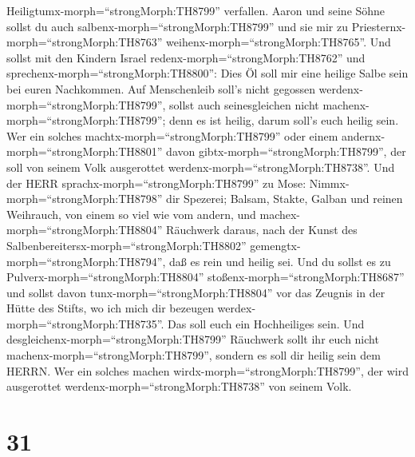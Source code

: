 Heiligtumx-morph=``strongMorph:TH8799'' verfallen.  Aaron
und seine Söhne sollst du auch salbenx-morph=``strongMorph:TH8799'' und
sie mir zu Priesternx-morph=``strongMorph:TH8763''
weihenx-morph=``strongMorph:TH8765''.  Und sollst mit den
Kindern Israel redenx-morph=``strongMorph:TH8762'' und
sprechenx-morph=``strongMorph:TH8800'': Dies Öl soll mir eine heilige
Salbe sein bei euren Nachkommen.  Auf Menschenleib soll's
nicht gegossen werdenx-morph=``strongMorph:TH8799'', sollst auch
seinesgleichen nicht machenx-morph=``strongMorph:TH8799''; denn es ist
heilig, darum soll's euch heilig sein.  Wer ein solches
machtx-morph=``strongMorph:TH8799'' oder einem
andernx-morph=``strongMorph:TH8801'' davon
gibtx-morph=``strongMorph:TH8799'', der soll von seinem Volk ausgerottet
werdenx-morph=``strongMorph:TH8738''.  Und der HERR
sprachx-morph=``strongMorph:TH8799'' zu Mose:
Nimmx-morph=``strongMorph:TH8798'' dir Spezerei; Balsam, Stakte, Galban
und reinen Weihrauch, von einem so viel wie vom andern, 
und machex-morph=``strongMorph:TH8804'' Räuchwerk daraus, nach der Kunst
des Salbenbereitersx-morph=``strongMorph:TH8802''
gemengtx-morph=``strongMorph:TH8794'', daß es rein und heilig sei.
 Und du sollst es zu Pulverx-morph=``strongMorph:TH8804''
stoßenx-morph=``strongMorph:TH8687'' und sollst davon
tunx-morph=``strongMorph:TH8804'' vor das Zeugnis in der Hütte des
Stifts, wo ich mich dir bezeugen werdex-morph=``strongMorph:TH8735''.
Das soll euch ein Hochheiliges sein.  Und
desgleichenx-morph=``strongMorph:TH8799'' Räuchwerk sollt ihr euch nicht
machenx-morph=``strongMorph:TH8799'', sondern es soll dir heilig sein
dem HERRN.  Wer ein solches machen
wirdx-morph=``strongMorph:TH8799'', der wird ausgerottet
werdenx-morph=``strongMorph:TH8738'' von seinem Volk.

\hypertarget{section-30}{%
\section{31}\label{section-30}}

